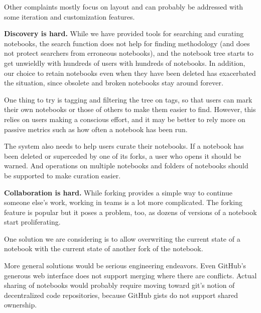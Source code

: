 Other complaints mostly focus on layout and can probably be addressed with
some iteration and customization features.


{\bf Discovery is hard.}
While we have provided tools for searching and curating notebooks, the
search function does not help for finding methodology (and does not protect
searchers from erroneous notebooks), and the notebook tree starts to get
unwieldly with hundreds of users with hundreds of notebooks. In addition,
our choice to retain notebooks even when they have been deleted has
exacerbated the situation, since obsolete and broken notebooks stay around
forever.

One thing to try is tagging and filtering the tree on tags, so that users
can mark their own notebooks or those of others to make them easier to
find. However, this relies on users making a conscious effort, and it may be
better to rely more on passive metrics such as how often a notebook has
been run.

The system also needs to help users curate their notebooks. If a notebook
has been deleted or superceded by one of its forks, a user who opens it
should be warned. And operations on multiple notebooks and folders of
notebooks should be supported to make curation easier.


{\bf Collaboration is hard.}
While forking provides a simple way to continue someone else's work, working
in teams is a lot more complicated. The forking feature is popular but it
poses a problem, too, as dozens of versions of a notebook start proliferating.

One solution we are considering is to allow overwriting the current state
of a notebook with the current state of another fork of the notebook.

More general solutions would be serious engineering endeavors. Even
GitHub's generous web interface does not support merging where there are
conflicts. Actual sharing of notebooks would probably require moving toward
git's notion of decentralized code repositories, because GitHub gists do
not support shared ownership.
